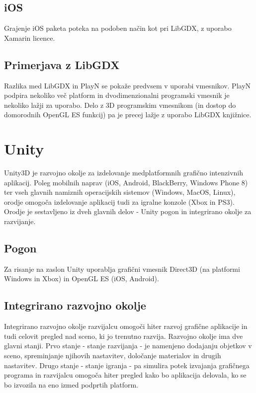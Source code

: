 \subsection{iOS}

Grajenje iOS paketa poteka na podoben način kot pri LibGDX, z uporabo Xamarin licence.

\subsection{Primerjava z LibGDX}

Razlika med LibGDX in PlayN se pokaže predvsem v uporabi vmesnikov. PlayN podpira nekoliko več platform in dvodimenzionalni programski vmesnik je nekoliko lažji za uporabo. Delo z 3D programskim vmesnikom (in dostop do domorodnih OpenGL ES funkcij) pa je precej lažje z uporabo LibGDX knjižnice. 

\section{Unity}

Unity3D \cite{unity} je razvojno okolje za izdelovanje medplatformnih grafično intenzivnih aplikacij. Poleg mobilnih naprav (iOS, Android, BlackBerry, Windows Phone 8) ter vseh glavnih namiznih operacijskih sistemov (Windows, MacOS, Linux), orodje omogoča izdelovanje aplikacij tudi za igralne konzole (Xbox in PS3). Orodje je sestavljeno iz dveh glavnih delov - Unity pogon in integrirano okolje za razvijanje.

\subsection{Pogon}

Za risanje na zaslon Unity uporablja grafični vmesnik Direct3D (na platformi Windows in Xbox) in OpenGL ES (iOS, Android).  

\subsection{Integrirano razvojno okolje} 

Integrirano razvojno okolje razvijalcu omogoči hiter razvoj grafične aplikacije in tudi celovit pregled nad sceno, ki jo trenutno razvija. Razvojno okolje ima dve glavni stanji. Prvo stanje - stanje razvijanja - je namenjeno dodajanju objetkov v sceno, spreminjanje njihovih nastavitev, določanje materialov in drugih nastavitev. Drugo stanje - stanje igranja - pa simulira potek izvajanja grafičnega programa in razvijalcu omogoča hiter pregled kako bo aplikacija delovala, ko se bo izvozila na eno izmed podprtih platform.


